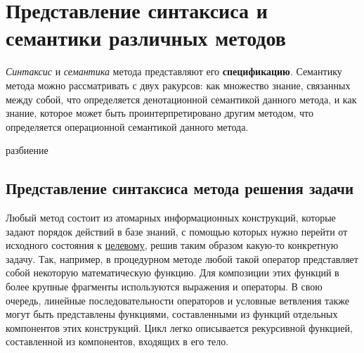 \section{Представление синтаксиса и семантики различных методов}

\textit{Синтаксис} и \textit{семантика} метода представляют его \textbf{спецификацию}. Семантику метода можно рассматривать с двух ракурсов: как множество знание, связанных между собой, что определяется денотационной семантикой данного метода, и как знание, которое может быть проинтерпретировано другим методом, что определяется операционной семантикой данного метода.

\begin{SCn}
\begin{scnrelfromset}{разбиение}
    \begin{scnindent}
    \end{scnindent}
    \begin{scnindent}
    \end{scnindent}
\end{scnrelfromset}
\end{SCn}

\subsection{Представление синтаксиса метода решения задачи}

Любый метод состоит из атомарных информационных конструкций, которые задают порядок действий в базе знаний, с помощью которых нужно перейти от исходного состояния к \underline{целевому}, решив таким образом какую-то конкретную задачу. Так, например, в процедурном методе любой такой оператор представляет собой некоторую математическую функцию. Для композиции этих функций в более крупные фрагменты используются выражения и операторы. В свою очередь, линейные последовательности операторов и условные ветвления также могут быть представлены функциями, составленными из функций отдельных компонентов этих конструкций. Цикл легко описывается рекурсивной функцией, составленной из компонентов, входящих в его тело.

